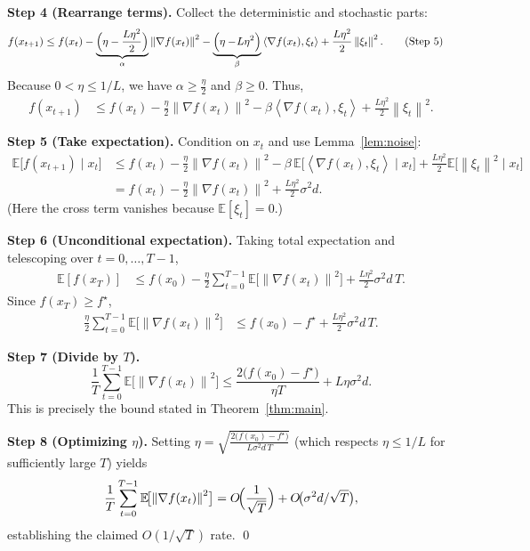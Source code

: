 \documentclass{article}
\newcommand{\E}{\mathbb{E}}
\newcommand{\norm}[1]{\left\lVert#1\right\rVert}
\newcommand{\inner}[2]{\left\langle #1,#2\right\rangle}
\begin{document}
\noindent\textbf{Step 4 (Rearrange terms).}  
Collect the deterministic and stochastic parts:
\begin{align}
f(x_{t+1})
&\le f(x_t)
   -\underbrace{\Bigl(\eta-\frac{L\eta^{2}}{2}\Bigr)}_{\alpha}
      \norm{\nabla f(x_t)}^{2}
   -\underbrace{\Bigl(\eta-\!L\eta^{2}\Bigr)}_{\beta}
      \inner{\nabla f(x_t)}{\xi_t}
   +\frac{L\eta^{2}}{2}\norm{\xi_t}^{2}. \tag{Step 5}
\end{align}
Because $0<\eta\le 1/L$, we have $\alpha\ge \frac{\eta}{2}$ and $\beta\ge 0$.
Thus,
\begin{align}
f(x_{t+1})
&\le f(x_t)-\frac{\eta}{2}\norm{\nabla f(x_t)}^{2}
   -\beta\inner{\nabla f(x_t)}{\xi_t}
   +\frac{L\eta^{2}}{2}\norm{\xi_t}^{2}. \tag{Step 6}
\end{align}

\noindent\textbf{Step 5 (Take expectation).}  
Condition on $x_t$ and use Lemma~\ref{lem:noise}:
\begin{align}
\E\bigl[f(x_{t+1})\mid x_t\bigr]
&\le f(x_t)-\frac{\eta}{2}\norm{\nabla f(x_t)}^{2}
   -\beta\,\E\bigl[\inner{\nabla f(x_t)}{\xi_t}\mid x_t\bigr]
   +\frac{L\eta^{2}}{2}\E\bigl[\norm{\xi_t}^{2}\mid x_t\bigr] \nonumber\\
&= f(x_t)-\frac{\eta}{2}\norm{\nabla f(x_t)}^{2}
   +\frac{L\eta^{2}}{2}\sigma^{2}d. \tag{Step 7}
\end{align}
(Here the cross term vanishes because $\E[\xi_t]=0$.)

\noindent\textbf{Step 6 (Unconditional expectation).}  
Taking total expectation and telescoping over $t=0,\dots,T-1$,
\begin{align}
\E[f(x_T)]
&\le f(x_0)-\frac{\eta}{2}\sum_{t=0}^{T-1}\E\!\bigl[\norm{\nabla f(x_t)}^{2}\bigr]
   +\frac{L\eta^{2}}{2}\sigma^{2}d\,T. \tag{Step 8}
\end{align}
Since $f(x_T)\ge f^{\star}$,
\begin{align}
\frac{\eta}{2}\sum_{t=0}^{T-1}\E\!\bigl[\norm{\nabla f(x_t)}^{2}\bigr]
&\le f(x_0)-f^{\star}
   +\frac{L\eta^{2}}{2}\sigma^{2}d\,T. \tag{Step 9}
\end{align}

\noindent\textbf{Step 7 (Divide by $T$).}
\[
\frac{1}{T}\sum_{t=0}^{T-1}\E\!\bigl[\norm{\nabla f(x_t)}^{2}\bigr]
\le \frac{2\bigl(f(x_0)-f^{\star}\bigr)}{\eta T}
   +L\eta\sigma^{2}d. \tag{Step 10}
\]
This is precisely the bound stated in Theorem~\ref{thm:main}.

\noindent\textbf{Step 8 (Optimizing $\eta$).}  
Setting $\eta = \sqrt{\frac{2\bigl(f(x_0)-f^{\star}\bigr)}{L\sigma^{2}d\,T}}$ (which respects $\eta\le 1/L$ for sufficiently large $T$) yields
\[
\frac{1}{T}\sum_{t=0}^{T-1}\E\!\bigl[\norm{\nabla f(x_t)}^{2}\bigr]
= O\!\Bigl(\frac{1}{\sqrt{T}}\Bigr)
   +O\!\bigl(\sigma^{2}d/\sqrt{T}\bigr),
\]
establishing the claimed $O(1/\sqrt{T})$ rate. \qed
\end{document}
